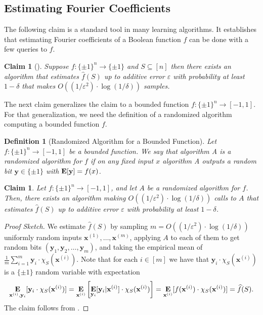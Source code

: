 \documentclass[10pt,a4paper]{article}
\theoremstyle{plain}
\newtheorem{claim}[theorem]{Claim}
\newtheorem{definition}[theorem]{Definition}
\theoremstyle{remark}
\theoremstyle{plain}
\providecommand{\E}{}
\renewcommand{\E}{\mathop{\bf E\/}}
\newcommand{\eps}{\varepsilon}
\renewcommand{\hat}{\widehat}
\newcommand{\pmone}{\{\pm 1\}}
\newcommand{\bfx}{\mathbf{x}}
\newcommand{\bfy}{\mathbf{y}}
\begin{document}
\subsection{Estimating Fourier Coefficients}
The following claim is a standard tool in many learning algorithms. It establishes that estimating Fourier coefficients of a Boolean function $f$ can be done with a few queries to $f$.
\begin{claim}[]
Suppose $f: \pmone^n \to \pmone$ and $S \subseteq [n]$ then there exists an algorithm that estimates $\hat{f}(S)$ up to additive error $\eps$ with probability at least $1-\delta$ that makes $O((1/\eps^2) \cdot \log(1/\delta))$ samples.
\end{claim}
%
%
%
%
%

The next claim generalizes the claim to a bounded function $f: \pmone^n \to [-1,1]$.
For that generalization, we need the definition of a randomized algorithm computing a bounded function $f$.
\begin{definition}[Randomized Algorithm for a Bounded Function]\label{def:randomized algorithm for bounded function}
Let $f: \pmone^n \to [-1,1]$ be a bounded function. We say that
algorithm A is a randomized algorithm for $f$ if on any fixed input $x$ algorithm A outputs a random bit $\bfy\in \pmone$ with $\E[\bfy] = f(x)$.
\end{definition}


\begin{claim}\label{claim:estimate Fourier non-Boolean}
Let $f: \pmone^n \to [-1,1]$, and 
let $A$ be a randomized algorithm for $f$.
Then, there exists an algorithm making $O((1/\eps^2) \cdot \log(1/\delta))$ calls to $A$ that estimates $\hat{f}(S)$ up to additive error $\eps$ with probability at least $1-\delta$.
\end{claim}
%
\begin{proof}[Proof Sketch]
We estimate $\hat{f}(S)$ by sampling $m = O((1/\eps^2) \cdot \log(1/\delta))$ uniformly random inputs $\bfx^{(1)}, \ldots, \bfx^{(m)}$, applying $A$ to  each of them to get random bits $(\bfy_1, \bfy_2, \ldots, \bfy_m)$, and taking the empirical mean of $\frac{1}{m} \sum_{i=1}^{m} \bfy_i \cdot \chi_S(\bfx^{(i)})$.
	Note that for each $i \in [m]$ we have that  $\bfy_i \cdot \chi_S(\bfx^{(i)})$ is a $\pmone$ random variable with expectation 
	$$\E_{\bfx^{(i)}, \bfy_i}[\bfy_i \cdot \chi_S(\bfx^{(i)})] = \E_{\bfx^{(i)}}\left[\E_{\bfy_i}[\bfy_i|\bfx^{(i)}]\cdot \chi_S(\bfx^{(i)})\right] = 
	\E_{\bfx^{(i)}}[f(\bfx^{(i)}) \cdot \chi_S(\bfx^{(i)})] = \hat{f}(S).$$
	The claim follows from .
\end{proof}
\end{document}

